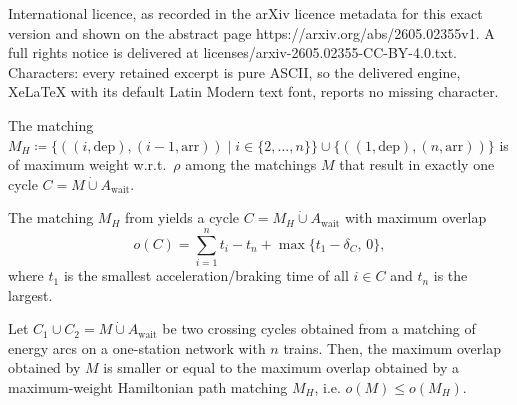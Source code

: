 \documentclass[10pt,a4paper]{amsart}
\newcommand{\arr}{\mathrm{arr}}
\newcommand{\dep}{\mathrm{dep}}
\newcommand{\dotcup}{\mathbin{\dot\cup}}
\newcommand{\energyact}{M}               %
\newcommand{\wait}{\mathrm{wait}}
\newcommand{\w}{\rho} %
\begin{document}
International licence, as recorded in the arXiv licence metadata for this exact version and shown on the abstract page https://arxiv.org/abs/2605.02355v1. A full rights notice is delivered at licenses/arxiv-2605.02355-CC-BY-4.0.txt. Characters: every retained excerpt is pure ASCII, so the delivered engine, XeLaTeX with its default Latin Modern text font, reports no missing character.
\begin{lemma}\label{lem:t-matching}
	The matching $\energyact_H \coloneqq \{ ((i, \dep),(i-1, \arr)) \mid i \in \{2, \dots , n \} \} \cup \{((1, \dep),(n, \arr)) \}$ is of maximum weight w.r.t.\ $\w$ among the matchings $\energyact$ that result in exactly one cycle $C = \energyact\dotcup A_{\wait}$.
\end{lemma}

\begin{lemma}
\label{lem:t-matching-overlap}
	The matching $\energyact_H$ from  yields a cycle $C = \energyact_H \dotcup A_{\wait}$ with maximum overlap 
	  \[o(C) = \sum_{i =1}^{n} t_i - t_{n} + \max\{t_{1} - \delta_{C},\, 0 \},\]
	where $t_1$ is the smallest acceleration/braking time of all $i \in C$ and $t_n$ is the largest.      
\end{lemma}

\begin{lemma}\label{lem:crossing}
	Let $C_1 \cup C_2 = \energyact\dotcup A_{\wait}$ be two crossing cycles obtained from a matching of energy arcs on a one-station network with $n$ trains. Then, the maximum overlap obtained by $\energyact$ is smaller or equal to the maximum overlap obtained by a maximum-weight Hamiltonian path matching $\energyact_H$, i.e. $o(\energyact) \leq o(\energyact_H)$.
\end{lemma}
\end{document}
